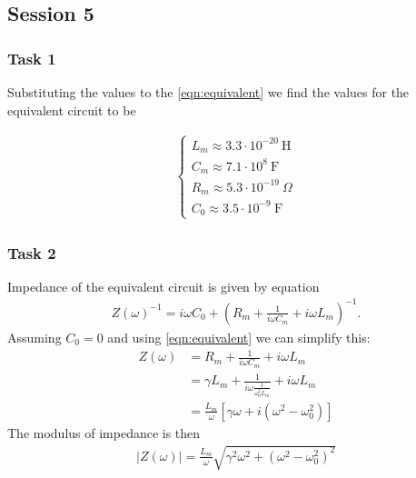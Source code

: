 \documentclass[12pt]{article}
\begin{document}
\subsection{Session 5}

\subsubsection{Task 1}
Substituting the values to the \eqref{eqn:equivalent} we find the values for the equivalent circuit to be

\begin{align*}
\begin{cases}
L_m \approx 3.3\cdot10^{-20}~\mathrm{H}\\
C_m \approx 7.1\cdot10^8~\mathrm{F}\\
R_m \approx 5.3\cdot10^{-19}~\Omega\\
C_0 \approx 3.5\cdot10^{-9}~\mathrm{F}
\end{cases}
\end{align*}
\subsubsection{Task 2}
Impedance of the equivalent circuit is given by equation
\begin{align*}
Z(\omega)^{-1} = i\omega C_0 + \left(R_m+\frac{1}{i\omega C_m} + i\omega L_m \right)^{-1}.
\end{align*}
Assuming $C_0=0$ and using \eqref{eqn:equivalent} we can simplify this:
\begin{align*}
Z(\omega) &= R_m+\frac{1}{i\omega C_m} + i\omega L_m\\
&=\gamma L_m+\frac{1}{i\omega \frac{1}{\omega_0^2L_m}} + i\omega L_m\\
&=\frac{L_m}{\omega}\left[\gamma\omega + i\left(\omega^2 - \omega_0^2\right)\right]
\end{align*}
The modulus of impedance is then
\begin{align} \label{eqn:impedance}
\left| Z(\omega) \right| = \frac{L_m}{\omega}\sqrt{\gamma^2\omega^2 +\left(\omega^2 - \omega_0^2\right)^2}
\end{align}
\end{document}
